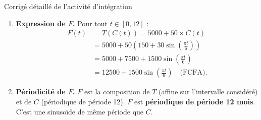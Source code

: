 \documentclass[11pt]{article}
\begin{document}
\begin{exoresolu}{Corrigé détaillé de l'activité d'intégration}
\begin{enumerate}
    \item \textbf{Expression de $F$.}
    Pour tout $t \in [0,12]$ :
    \begin{align*}
    F(t) &= T(C(t)) = 5000 + 50 \times C(t) \\
         &= 5000 + 50 \left(150 + 30 \sin\left(\frac{\pi t}{6}\right)\right) \\
         &= 5000 + 7500 + 1500 \sin\left(\frac{\pi t}{6}\right) \\
         &= \boxed{12500 + 1500 \sin\left(\frac{\pi t}{6}\right)} \quad \text{(FCFA)}.
    \end{align*}

    \item \textbf{Périodicité de $F$.}
    $F$ est la composition de $T$ (affine sur l'intervalle considéré) et de $C$ (périodique de période 12).
    $F$ est \textbf{périodique de période 12 mois}. C'est une sinusoïde de même période que $C$.
\end{enumerate}


\end{exoresolu}
\end{document}
